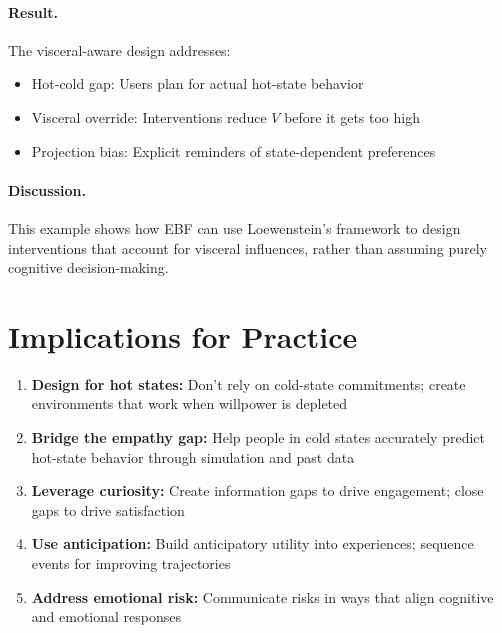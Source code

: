 \paragraph{Result.}
The visceral-aware design addresses:
\begin{itemize}[nosep]
\item Hot-cold gap: Users plan for actual hot-state behavior
\item Visceral override: Interventions reduce $V$ before it gets too high
\item Projection bias: Explicit reminders of state-dependent preferences
\end{itemize}

\paragraph{Discussion.}
This example shows how EBF can use Loewenstein's framework to design interventions that account for visceral influences, rather than assuming purely cognitive decision-making.


\section{Implications for Practice}
\label{sec:lo-practice}

\begin{tcolorbox}[colback=green!5!white, colframe=green!75!black,
    title=Practical Implications]
\begin{enumerate}
\item \textbf{Design for hot states:} Don't rely on cold-state commitments; create environments that work when willpower is depleted
\item \textbf{Bridge the empathy gap:} Help people in cold states accurately predict hot-state behavior through simulation and past data
\item \textbf{Leverage curiosity:} Create information gaps to drive engagement; close gaps to drive satisfaction
\item \textbf{Use anticipation:} Build anticipatory utility into experiences; sequence events for improving trajectories
\item \textbf{Address emotional risk:} Communicate risks in ways that align cognitive and emotional responses
\end{enumerate}
\end{tcolorbox}


